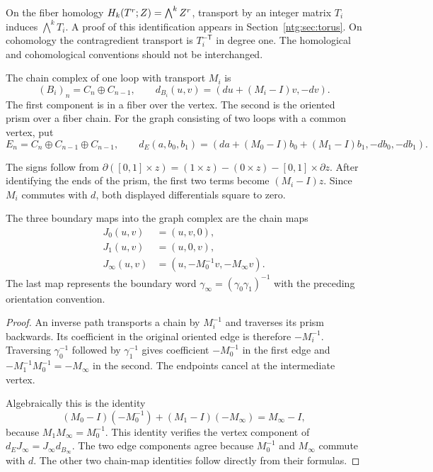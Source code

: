On the fiber homology $H_k(T^r;Z)=\bigwedge^kZ^r$, transport by
an integer matrix $T_i$ induces $\bigwedge^kT_i$. A proof of this
identification appears in Section~\ref{ntg:sec:torus}. On cohomology the
contragredient transport is $T_i^{-\mathsf T}$ in degree one. The
homological and cohomological conventions should not be interchanged.

\begin{definition}\label{ntg:def:prism}
The chain complex of one loop with transport $M_i$ is
\[
 (B_i)_n=C_n\oplus C_{n-1},\qquad
 d_{B_i}(u,v)=(du+(M_i-I)v,-dv).
\]
The first component is in a fiber over the vertex. The second is the
oriented prism over a fiber chain. For the graph consisting of two
loops with a common vertex, put
\begin{equation}\label{ntg:eq:graph}
 E_n=C_n\oplus C_{n-1}\oplus C_{n-1},\qquad
 d_E(a,b_0,b_1)=(da+(M_0-I)b_0+(M_1-I)b_1,-db_0,-db_1).
\end{equation}
\end{definition}

The signs follow from
$\partial([0,1]\times z)=(1\times z)-(0\times z)-[0,1]\times\partial z$.
After identifying the ends of the prism, the first two terms become
$(M_i-I)z$. Since $M_i$ commutes with $d$, both displayed
differentials square to zero.

\begin{lemma}\label{ntg:lem:boundary-word}
The three boundary maps into the graph complex are the chain maps
\begin{equation}\label{ntg:eq:boundary-word}
 \begin{split}
 J_0(u,v)&=(u,v,0),\\
 J_1(u,v)&=(u,0,v),\\
 J_\infty(u,v)&=(u,-M_0^{-1}v,-M_\infty v).
 \end{split}
\end{equation}
The last map represents the boundary word
$\gamma_\infty=(\gamma_0\gamma_1)^{-1}$ with the preceding
orientation convention.
\end{lemma}

\begin{proof}
An inverse path transports a chain by $M_i^{-1}$ and traverses its
prism backwards. Its coefficient in the original oriented edge is
therefore $-M_i^{-1}$. Traversing $\gamma_0^{-1}$ followed by
$\gamma_1^{-1}$ gives coefficient $-M_0^{-1}$ in the first edge and
$-M_1^{-1}M_0^{-1}=-M_\infty$ in the second. The endpoints cancel
at the intermediate vertex.

Algebraically this is the identity
\begin{equation}\label{ntg:eq:word-identity}
 (M_0-I)(-M_0^{-1})+(M_1-I)(-M_\infty)=M_\infty-I,
\end{equation}
because $M_1M_\infty=M_0^{-1}$. This identity verifies the vertex
component of $d_EJ_\infty=J_\infty d_{B_\infty}$. The two edge
components agree because $M_0^{-1}$ and $M_\infty$ commute with $d$.
The other two chain-map identities follow directly from their formulas.
\end{proof}

